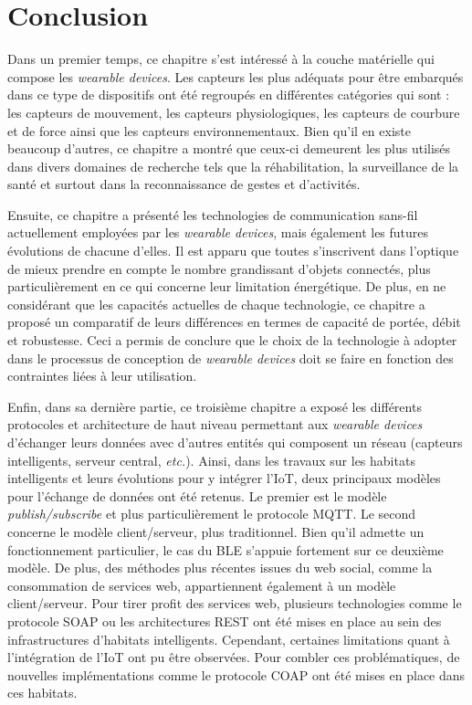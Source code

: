 \section{Conclusion}

Dans un premier temps, ce chapitre s'est intéressé à la couche matérielle qui compose les \textit{wearable devices}. Les capteurs les plus adéquats pour être embarqués dans ce type de dispositifs ont été regroupés en différentes catégories qui sont : les capteurs de mouvement, les capteurs physiologiques, les capteurs de courbure et de force ainsi que les capteurs environnementaux. Bien qu'il en existe beaucoup d'autres, ce chapitre a montré que ceux-ci demeurent les plus utilisés dans divers domaines de recherche tels que la réhabilitation, la surveillance de la santé et surtout dans la reconnaissance de gestes et d'activités.

Ensuite, ce chapitre a présenté les technologies de communication sans-fil actuellement employées par les \textit{wearable devices}, mais également les futures évolutions de chacune d'elles. Il est apparu que toutes s'inscrivent dans l'optique de mieux prendre en compte le nombre grandissant d'objets connectés, plus particulièrement en ce qui concerne leur limitation énergétique. De plus, en ne considérant que les capacités actuelles de chaque technologie, ce chapitre a proposé un comparatif de leurs différences en termes de capacité de portée, débit et robustesse. Ceci a permis de conclure que le choix de la technologie à adopter dans le processus de conception de \textit{wearable devices} doit se faire en fonction des contraintes liées à leur utilisation.

Enfin, dans sa dernière partie, ce troisième chapitre a exposé les différents protocoles et architecture de haut niveau permettant aux \textit{wearable devices} d'échanger leurs données avec d'autres entités qui composent un réseau (capteurs intelligents, serveur central, \textit{etc.}). Ainsi, dans les travaux sur les habitats intelligents et leurs évolutions pour y intégrer l'\acs{IoT}, deux principaux modèles pour l'échange de données ont été retenus. Le premier est le modèle \textit{publish/subscribe} et plus particulièrement le protocole \acs{MQTT}. Le second concerne le modèle client/serveur, plus traditionnel. Bien qu'il admette un fonctionnement particulier, le cas du \acs{BLE} s'appuie fortement sur ce deuxième modèle. De plus, des méthodes plus récentes issues du web social, comme la consommation de services web, appartiennent également à un modèle client/serveur. Pour tirer profit des services web, plusieurs technologies comme le protocole \acs{SOAP} ou les architectures \acs{REST} ont été mises en place au sein des infrastructures d'habitats intelligents. Cependant, certaines limitations quant à l'intégration de l'\acs{IoT} ont pu être observées. Pour combler ces problématiques, de nouvelles implémentations comme le protocole \acs{COAP} ont été mises en place dans ces habitats.
